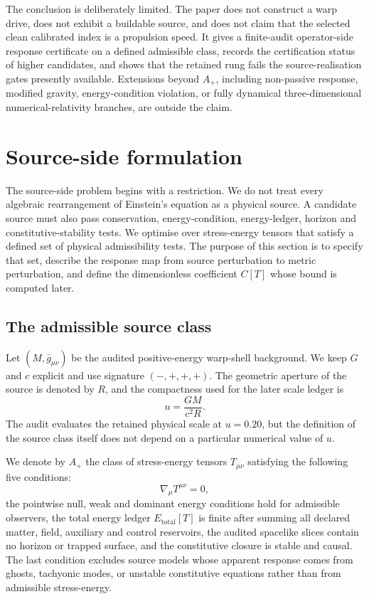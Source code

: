 \documentclass[11pt,a4paper]{article}
\begin{document}
The conclusion is deliberately limited. The paper does not construct a warp drive, does not exhibit a buildable source, and does not claim that the selected clean calibrated index is a propulsion speed. It gives a finite-audit operator-side response certificate on a defined admissible class, records the certification status of higher candidates, and shows that the retained rung fails the source-realisation gates presently available. Extensions beyond $A_{+}$, including non-passive response, modified gravity, energy-condition violation, or fully dynamical three-dimensional numerical-relativity branches, are outside the claim.

\section{Source-side formulation}\label{sec:formulation}

The source-side problem begins with a restriction. We do not treat every algebraic rearrangement of Einstein's equation as a physical source. A candidate source must also pass conservation, energy-condition, energy-ledger, horizon and constitutive-stability tests. We optimise over stress-energy tensors that satisfy a defined set of physical admissibility tests. The purpose of this section is to specify that set, describe the response map from source perturbation to metric perturbation, and define the dimensionless coefficient $C[T]$ whose bound is computed later.

\subsection{The admissible source class}

Let $(M,\bar{g}_{\mu\nu})$ be the audited positive-energy warp-shell background. We keep $G$ and $c$ explicit and use signature $(-,+,+,+)$. The geometric aperture of the source is denoted by $R$, and the compactness used for the later scale ledger is
\[
u=\frac{GM}{c^{2}R}.
\]
The audit evaluates the retained physical scale at $u=0.20$, but the definition of the source class itself does not depend on a particular numerical value of $u$.

We denote by $A_{+}$ the class of stress-energy tensors $T_{\mu\nu}$ satisfying the following five conditions:
\[
\nabla_{\mu}T^{\mu\nu}=0,
\]
the pointwise null, weak and dominant energy conditions hold for admissible observers, the total energy ledger $E_{\mathrm{total}}[T]$ is finite after summing all declared matter, field, auxiliary and control reservoirs, the audited spacelike slices contain no horizon or trapped surface, and the constitutive closure is stable and causal. The last condition excludes source models whose apparent response comes from ghosts, tachyonic modes, or unstable constitutive equations rather than from admissible stress-energy.
\end{document}
